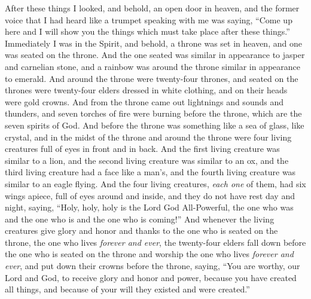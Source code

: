 \begin{biblechapter} %
 After these things I looked, and behold, an open door in heaven, and the former voice that I had heard like a trumpet speaking with me was saying, “Come up here and I will show you the things which must take place after these things.”
\verse Immediately I was in the Spirit, and behold, a throne was set in heaven, and one was seated on the throne.
\verse And the one seated was similar in appearance to jasper and carnelian stone, and a rainbow was around the throne similar in appearance to emerald.
\verse And around the throne were twenty-four thrones, and seated on the thrones were twenty-four elders dressed in white clothing, and on their heads were gold crowns.
\verse And from the throne came out lightnings and sounds and thunders, and seven torches of fire were burning before the throne, which are the seven spirits of God.
\verse And before the throne was something like a sea of glass, like crystal, and in the midst of the throne and around the throne were four living creatures full of eyes in front and in back.
\verse And the first living creature was similar to a lion, and the second living creature was similar to an ox, and the third living creature had a face like a man’s, and the fourth living creature was similar to an eagle flying.
\verse And the four living creatures, \textit{each one} of them, had six wings apiece, full of eyes around and inside, and they do not have rest day and night, saying, “Holy, holy, holy is the Lord God All-Powerful, 
the one who was and the one who is and the one who is coming!”
\verse And whenever the living creatures give glory and honor and thanks to the one who is seated on the throne, the one who lives \textit{forever and ever},
\verse the twenty-four elders fall down before the one who is seated on the throne and worship the one who lives \textit{forever and ever}, and put down their crowns before the throne, saying,
\verse “You are worthy, our Lord and God, 
to receive glory and honor and power, 
because you have created all things, 
and because of your will they existed and were created.”
\end{biblechapter}

